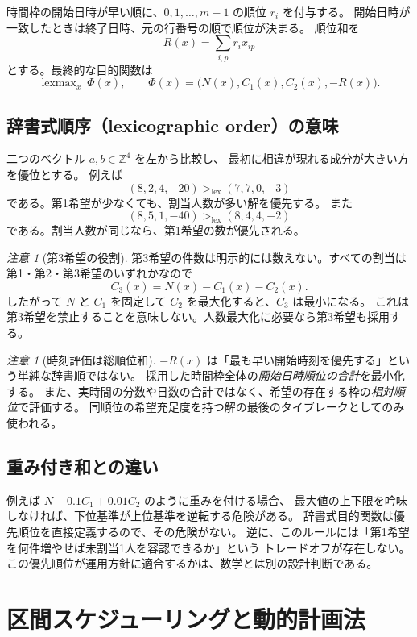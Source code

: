 \documentclass[11pt,a4paper]{ltjsarticle}
\theoremstyle{definition}
\theoremstyle{remark}
\newtheorem{remark}[theorem]{注意}
\newcommand{\lexmax}{\operatorname{lexmax}}
\begin{document}
時間枠の開始日時が早い順に、$0,1,\dots,m-1$ の順位 $r_i$ を付与する。
開始日時が一致したときは終了日時、元の行番号の順で順位が決まる。
順位和を
\[
 R(x)=\sum_{i,p}r_i x_{ip}
\]
とする。最終的な目的関数は
\begin{equation}
 \boxed{\displaystyle
 \lexmax_x\ \Phi(x),\qquad
 \Phi(x)=\bigl(N(x),C_1(x),C_2(x),-R(x)\bigr)}.
 \label{eq:lexobj}
\end{equation}

\subsection{辞書式順序（lexicographic order）の意味}
二つのベクトル $a,b\in\mathbb Z^4$ を左から比較し、
最初に相違が現れる成分が大きい方を優位とする。
例えば
\[
 (8,2,4,-20)>_{\mathrm{lex}}(7,7,0,-3)
\]
である。第1希望が少なくても、割当人数が多い解を優先する。
また
\[
 (8,5,1,-40)>_{\mathrm{lex}}(8,4,4,-2)
\]
である。割当人数が同じなら、第1希望の数が優先される。

\begin{remark}[第3希望の役割]
第3希望の件数は明示的には数えない。すべての割当は第1・第2・第3希望のいずれかなので
\[
 C_3(x)=N(x)-C_1(x)-C_2(x).
\]
したがって $N$ と $C_1$ を固定して $C_2$ を最大化すると、$C_3$ は最小になる。
これは第3希望を禁止することを意味しない。人数最大化に必要なら第3希望も採用する。
\end{remark}

\begin{remark}[時刻評価は総順位和]
$-R(x)$ は「最も早い開始時刻を優先する」という単純な辞書順ではない。
採用した時間枠全体の\emph{開始日時順位の合計}を最小化する。
また、実時間の分数や日数の合計ではなく、希望の存在する枠の\emph{相対順位}で評価する。
同順位の希望充足度を持つ解の最後のタイブレークとしてのみ使われる。
\end{remark}

\subsection{重み付き和との違い}
例えば $N+0.1C_1+0.01C_2$ のように重みを付ける場合、
最大値の上下限を吟味しなければ、下位基準が上位基準を逆転する危険がある。
辞書式目的関数は優先順位を直接定義するので、その危険がない。
逆に、このルールには「第1希望を何件増やせば未割当1人を容認できるか」という
トレードオフが存在しない。この優先順位が運用方針に適合するかは、数学とは別の設計判断である。

\section{区間スケジューリングと動的計画法}
\end{document}
